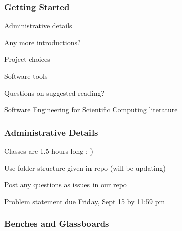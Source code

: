 \documentclass[t,12pt,numbers,fleqn]{beamer}
\begin{document}




\begin{frame}
\frametitle{Getting Started}

\bi
\item Administrative details
\item Any more introductions?
\item Project choices
\item Software tools
\item Questions on suggested reading?
\item Software Engineering for Scientific Computing literature
\ei

\end{frame}


\begin{frame}
\frametitle{Administrative Details}

\bi
\item Classes are 1.5 hours long  :-)
\item Use folder structure given in repo (will be updating)
\item Post any questions as issues in our repo
\item Problem statement due Friday, Sept 15 by 11:59 pm
\ei

\end{frame}


\begin{frame}
\frametitle{Benches and Glassboards}


\end{frame}

\end{document}

